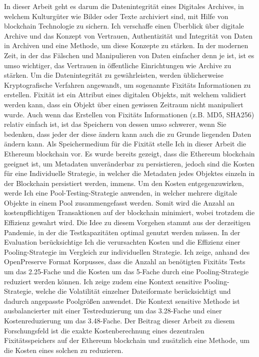 \documentclass[final]{vutinfth}
\begin{document}
\frontmatter 

  \addstatementpage

\begin{kurzfassung}
In dieser Arbeit geht es darum die Datenintegrität eines Digitales Archives, in welchem Kulturgüter wie Bilder oder Texte archiviert sind, mit Hilfe von blockchain Technologie zu sichern. Ich verschaffe einen Überblick über digitale Archive und das Konzept von Vertrauen, Authentizität und Integrität von Daten in Archiven und eine Methode, um diese Konzepte zu stärken. In der modernen Zeit, in der das Fälschen und Manipulieren von Daten einfacher denn je ist, ist es umso wichtiger, das Vertrauen in öffentliche Einrichtungen wie Archive zu stärken.
Um die Datenintegrität zu gewährleisten, werden üblicherweise Kryptografische Verfahren angewandt, um sogenannte Fixitäts Informationen zu erstellen. Fixität ist ein Attribut eines digitalen Objekts, mit welchem validiert werden kann, dass ein Objekt über einen gewissen Zeitraum nicht manipuliert wurde. Auch wenn das Erstellen von Fixitäts Informationen (z.B. MD5, SHA256) relativ einfach ist, ist das Speichern von dessen umso schwerer, wenn Sie bedenken, dass jeder der diese ändern kann auch die zu Grunde liegenden Daten ändern kann.
Als Speichermedium für die Fixität stelle Ich in dieser Arbeit die Ethereum blockchain vor. Es wurde bereits gezeigt, dass die Ethereum blockchain geeignet ist, um Metadaten unveränderbar zu persistieren, jedoch sind die Kosten für eine Individuelle Strategie, in welcher die Metadaten jedes Objektes einzeln in der Blockchain persistiert werden, immens.
Um den Kosten entgegenzuwirken, werde Ich eine Pool-Testing-Strategie anwenden, in welcher mehrere digitale Objekte in einem Pool zusammengefasst werden. Somit wird die Anzahl an kostenpflichtigen Transaktionen auf der blockchain minimiert, wobei trotzdem die Effizienz gewahrt wird. Die Idee zu diesem Vorgehen stammt aus der derzeitigen Pandemie, in der die Testkapazitäten optimal genutzt werden müssen.
In der Evaluation berücksichtige Ich die verursachten Kosten und die Effizienz einer Pooling-Strategie im Vergleich zur individuellen Strategie. Ich zeige, anhand des OpenPreserve Format Korpusses, dass die Anzahl an benötigten Fixitäts Tests um das 2.25-Fache und die Kosten um das 5-Fache durch eine Pooling-Strategie reduziert werden können. Ich zeige zudem eine Kontext sensitive Pooling-Strategie, welche die Volatilität einzelner Dateiformate berücksichtigt und dadurch angepasste Poolgrößen anwendet. Die Kontext sensitive Methode ist ausbalancierter mit einer Testreduzierung um das 3.28-Fache und einer Kostenreduzierung um das 3.48-Fache.
Der Beitrag dieser Arbeit zu diesem Forschungsfeld ist die exakte Kostenberechnung eines dezentralen Fixitätsspeichers auf der Ethereum blockchain und zusätzlich eine Methode, um die Kosten eines solchen zu reduzieren.

 \end{kurzfassung}
\end{document}
